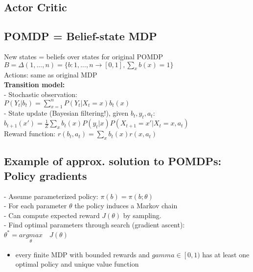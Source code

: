 \subsection{Actor Critic}








\subsection{POMDP = Belief-state MDP}
New states = beliefs over states for original POMDP\\
$B=\Delta({1,...,n})=\{ b:{1,...,n} \rightarrow [0,1],\sum_x b(x)=1 \}$\\
Actions: same as original MDP\\
\textbf{Transition model:}\\
- Stochastic observation:\\
$P(Y_t|b_t)=\sum_{x=1}^n P(Y_t|X_t=x)b_t(x)$\\
- State update (Bayesian filtering!), given $b_t, y_t, a_t$:
$b_{t+1}(x')=\frac{1}{Z}\sum_xb_t(x)P(y_t|x)P(X_{t+1}=x'|X_t=x,a_t)$\\
Reward function: $r(b_t, a_t)=\sum_x b_t(x)r(x,a_t)$

\subsection{Example of approx. solution to POMDPs: Policy gradients}
- Assume parameterized policy: $\pi(b)=\pi(b;\theta)$\\
- For each parameter $\theta$ the policy induces a Markov chain\\
- Can compute expected reward $J(\theta)$ by sampling.\\
- Find optimal parameters through search (gradient ascent):
$\theta^* = \underset{\theta}{arg max}\quad J(\theta)$


\begin{itemize}
    \item every finite MDP with bounded rewards and $gamma \in \left[ 0,1)$ has at least one optimal policy and
    unique value function
\end{itemize}